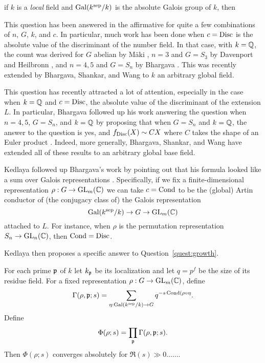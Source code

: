 if $k$ is a {\em
local} field and $\operatorname{Gal}(k^{\mathrm{sep}}/k)$ is the absolute Galois group of $k$, then 

This question has been answered in the affirmative for quite a few combinations
of $n$, $G$, $k$, and $c$. In particular, much work has been done when $c =
\operatorname{Disc}$ is the absolute value of the discriminant of the number field. In that
case, with $k = \mathbb{Q}$, the count was derived for $G$ abelian by M\"aki
\cite{MakiDisc}, $n = 3$ and $G = S_3$ by Davenport and Heilbronn \cite{DH},
and $n = 4, 5$ and $G = S_n$ by Bhargava \cite{BhargavaQuarticCount,
BhargavaQuinticCount}. This was recently extended by Bhargava, Shankar, and
Wang \cite{BhargavaShankarWang} to $k$ an arbitrary global field.



This question has recently attracted a lot of attention, especially in the case
when $k = \mathbb{Q}$ and $c = \operatorname{Disc}$, the absolute value of the discriminant of the
extension $L$. In particular, Bhargava followed up his work answering the
question when $n = 4, 5$, $G = S_n$, and $k = \mathbb{Q}$ \cite{BhargavaQuarticCount,
BhargavaQuinticCount} by proposing that when $G = S_n$ and $k = \mathbb{Q}$, the answer to
the question is yes, and $f_{\operatorname{Disc}}(X) \sim CX$ where $C$ takes the shape of an
Euler product \cite{bharagavamass}. Indeed, more generally, Bhargava, Shankar, and Wang
\cite{BhargavaShankarWang} have extended all of these results to an arbitrary global
base field.

Kedlaya followed up Bhargava's work by pointing out that his formula looked
like a sum over Galois representations \cite{KedlayaMass}. Specifically, if we
fix a finite-dimensional representation $\rho : G \to \operatorname{GL}_m(\mathbb{C})$ we can take $c
= \operatorname{Cond}$ to be the (global) Artin conductor of (the conjugacy class of) the Galois
representation
\[ \operatorname{Gal}(k^{\mathrm{sep}}/k) \to G \to \operatorname{GL}_m(\mathbb{C}) \]
attached to $L$. For instance, when $\rho$ is the permutation representation
$S_n \to \operatorname{GL}_n(\mathbb{C})$, then $\operatorname{Cond} = \operatorname{Disc}$. 



Kedlaya then proposes a
specific answer to Question~\ref{quest:growth}.

\begin{question}
  For each prime $\mathfrak{p}$ of $k$ let $k_{\mathfrak{p}}$ be its localization and let $q = p^f$ be the size of its residue field. For a fixed representation $\rho : G \to \operatorname{GL}_m(\mathbb{C})$, define
  \[ \Gamma(\rho, \mathfrak{p}; s) = \sum_{\eta: \operatorname{Gal}(k^{\mathrm{sep}}/k) \to G} q^{-s\operatorname{Cond}(\rho \circ \eta}. \]
  Define
  \[ \Phi(\rho; s) = \prod_{\mathfrak{p}} \Gamma(\rho, \mathfrak{p}; s). \]
  Then $\Phi(\rho; s)$ converges absolutely for $\Re(s) \gg 0$.......
\end{question}
